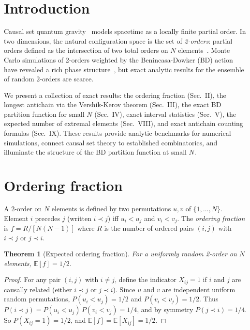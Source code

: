 \documentclass[aps,prd,twocolumn,superscriptaddress,nofootinbib]{revtex4-2}
\newtheorem{theorem}{Theorem}
\begin{document}
\maketitle

\section{Introduction}

Causal set quantum gravity~\cite{bombelli1987,surya2019} models spacetime as a locally finite partial order. In two dimensions, the natural configuration space is the set of \emph{2-orders}: partial orders defined as the intersection of two total orders on $N$ elements~\cite{brightwell1991,glaser2018}. Monte Carlo simulations of 2-orders weighted by the Benincasa-Dowker (BD) action~\cite{benincasa2010} have revealed a rich phase structure~\cite{surya2012,glaser2018}, but exact analytic results for the ensemble of random 2-orders are scarce.

We present a collection of exact results: the ordering fraction (Sec.~II), the longest antichain via the Vershik-Kerov theorem (Sec.~III), the exact BD partition function for small $N$ (Sec.~IV), exact interval statistics (Sec.~V), the expected number of extremal elements (Sec.~VIII), and exact antichain counting formulas (Sec.~IX). These results provide analytic benchmarks for numerical simulations, connect causal set theory to established combinatorics, and illuminate the structure of the BD partition function at small $N$.

\section{Ordering fraction}

A 2-order on $N$ elements is defined by two permutations $u, v$ of $\{1, \ldots, N\}$. Element $i$ precedes $j$ (written $i \prec j$) iff $u_i < u_j$ and $v_i < v_j$. The \emph{ordering fraction} is $f = R / [N(N-1)]$ where $R$ is the number of ordered pairs $(i,j)$ with $i \prec j$ or $j \prec i$.

\begin{theorem}[Expected ordering fraction]
For a uniformly random 2-order on $N$ elements, $\mathbb{E}[f] = 1/2$.
\end{theorem}

\begin{proof}
For any pair $(i,j)$ with $i \neq j$, define the indicator $X_{ij} = 1$ if $i$ and $j$ are causally related (either $i \prec j$ or $j \prec i$). Since $u$ and $v$ are independent uniform random permutations, $P(u_i < u_j) = 1/2$ and $P(v_i < v_j) = 1/2$. Thus $P(i \prec j) = P(u_i < u_j)\,P(v_i < v_j) = 1/4$, and by symmetry $P(j \prec i) = 1/4$. So $P(X_{ij} = 1) = 1/2$, and $\mathbb{E}[f] = \mathbb{E}[X_{ij}] = 1/2$.
\end{proof}
\end{document}
